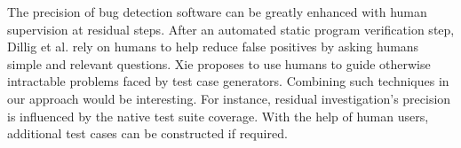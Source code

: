 The precision of bug detection software can be greatly enhanced with
human supervision at residual steps.  After an automated static
program verification step, Dillig et al. \cite{Dillig:2012:AED:2254064.2254087}
rely on humans to help reduce false positives by asking humans simple
and relevant questions.  Xie \cite{Xie2012SCAM} proposes to use humans to
guide otherwise intractable problems faced by test case
generators.  Combining such techniques in our approach would be interesting.  For instance, residual investigation's precision is
influenced by the native test suite coverage.  With the help of human
users, additional test cases can be constructed if required.
